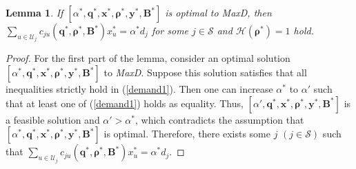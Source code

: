 \documentclass[10pt,journal,final,finalsubmission,twocolumn]{IEEEtran}
\newtheorem{lemma}[theorem]{Lemma}
\begin{document}
\begin{lemma}\label{property 1}
If $[\alpha ^*, \boldsymbol{q}^*,\boldsymbol{x}^*,\boldsymbol{\rho}^*, \boldsymbol{y}^*, \boldsymbol{B}^*]$ is optimal to MaxD, then $\sum_{u\in \mathcal{U}_j} c_{ju}\left (\boldsymbol{q}^*,\boldsymbol{ \rho}^*, \boldsymbol{B}^*\right )x_u^*= \alpha^* d_j$ for some $j\in \mathcal{S}$ and $\mathcal{H}(\boldsymbol{\rho^*}) = 1$ hold.
\end{lemma}
\begin{proof} 
For the first part of the lemma, consider an optimal solution $[\alpha ^*, \boldsymbol{q}^*,\boldsymbol{x}^*,\boldsymbol{\rho}^*, \boldsymbol{y}^*, \boldsymbol{B}^*]$ to {\em MaxD}. Suppose this solution satisfies that all inequalities strictly hold in (\ref{demand1}). Then one can increase $\alpha^*$ to $\alpha'$ such that at least one of (\ref{demand1}) holds as equality.  Thus, $[\alpha', \boldsymbol{q}^*,\boldsymbol{x}^*,\boldsymbol{\rho}^*, \boldsymbol{y}^*,\boldsymbol{B}^*]$ is a feasible solution and $\alpha'>\alpha^*$, which contradicts the assumption that $[\alpha^*, \boldsymbol{q}^*,\boldsymbol{x}^*,\boldsymbol{\rho}^*, \boldsymbol{y}^*,\boldsymbol{B}^*]$ is optimal. Therefore, there exists some $j$ $(j\in \mathcal{S})$ such that $\sum_{u\in \mathcal{U}_j} c_{ju}\left (\boldsymbol{q}^*,\boldsymbol{ \rho}^*, \boldsymbol{B}^*\right )x_u^*= \alpha^* d_j$.


\end{proof}
\end{document}
